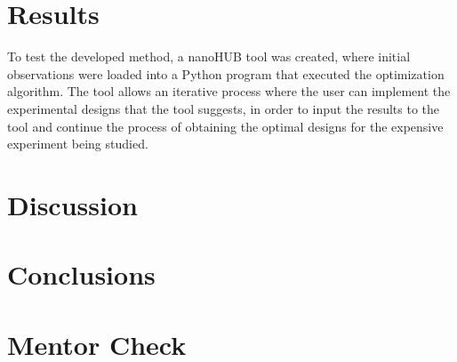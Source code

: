 \documentclass{article}
\begin{document}
\section{Results}

To test the developed method, a nanoHUB tool was created, where initial observations were loaded into a Python program that executed the optimization algorithm. The tool allows an iterative process where the user can implement the experimental designs that the tool suggests, in order to input the results to the tool and continue the process of obtaining the optimal designs for the expensive experiment being studied.

\section{Discussion}

\section{Conclusions}




\section{Mentor Check}
\end{document}
